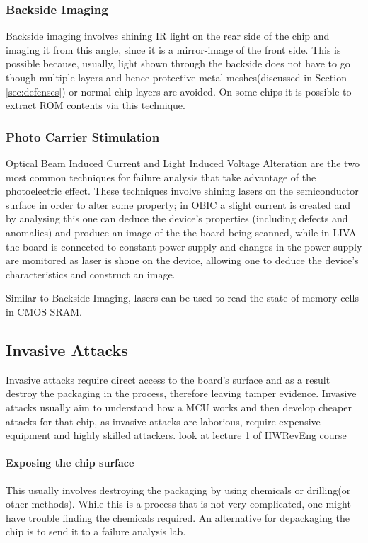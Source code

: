 	\subsubsection{Backside Imaging}
	Backside imaging involves shining IR light on the rear side of the chip and imaging it from this angle, since it is a mirror-image of the front side. This is possible because, usually, light shown through the backside does not have to go though multiple layers and hence protective metal meshes(discussed in Section \ref{sec:defenses}) or normal chip layers are avoided. On some chips it is possible to extract ROM contents via this technique.
	
	\subsubsection{Photo Carrier Stimulation}
	Optical Beam Induced Current and Light Induced Voltage Alteration are the two most common techniques for failure analysis that take advantage of the photoelectric effect. These techniques involve shining lasers on the semiconductor surface in order to alter some property; in OBIC a slight current is created and by analysing this one can deduce the device's properties (including defects and anomalies) and produce an image of the the board being scanned, while in LIVA the board is connected to constant power supply and changes in the power supply are monitored as laser is shone on the device, allowing one to deduce the device's characteristics and construct an image\citep{cole:OBIC}.
	
	Similar to Backside Imaging, lasers can be used to read the state of memory cells in CMOS SRAM.
	
	\subsection{Invasive Attacks}
	Invasive attacks require direct access to the board's surface and as a result destroy the packaging in the process, therefore leaving tamper evidence. Invasive attacks usually aim to understand how a MCU works and then develop cheaper attacks for that chip, as invasive attacks are laborious, require expensive equipment and highly skilled attackers. {\color{red} look at lecture 1 of HWRevEng course}
	
	\paragraph{Exposing the chip surface} This usually involves destroying the packaging by using chemicals or drilling(or other methods). While this is a process that is not very complicated\citep{sergei:thesis}, one might have trouble finding the chemicals required. An alternative for depackaging the chip is to send it to a failure analysis lab\citep{website:hacking_the_pic}.
	
